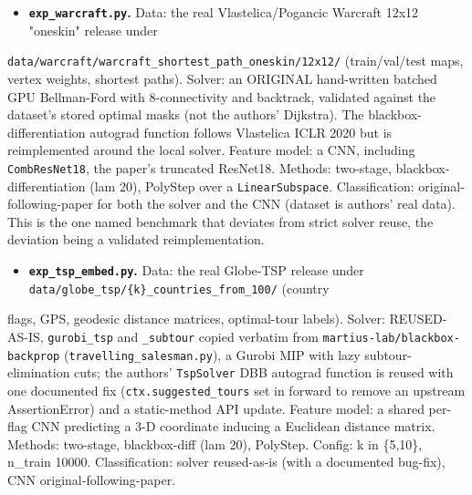 \documentclass[10pt]{article}
\begin{document}
\begin{itemize}\setlength{\itemsep}{2pt}
\item \textbf{\texttt{exp\_warcraft.py}.} Data: the real Vlastelica/Pogancic Warcraft 12x12 "oneskin" release under
\end{itemize}
  \texttt{data/warcraft/warcraft\_shortest\_path\_oneskin/12x12/} (train/val/test maps, vertex weights, shortest paths). Solver:
  an ORIGINAL hand-written batched GPU Bellman-Ford with 8-connectivity and backtrack, validated against the dataset's
  stored optimal masks (not the authors' Dijkstra). The blackbox-differentiation autograd function follows Vlastelica
  ICLR 2020 but is reimplemented around the local solver. Feature model: a CNN, including \texttt{CombResNet18}, the paper's
  truncated ResNet18. Methods: two-stage, blackbox-differentiation (lam 20), PolyStep over a \texttt{LinearSubspace}.
  Classification: original-following-paper for both the solver and the CNN (dataset is authors' real data). This is the
  one named benchmark that deviates from strict solver reuse, the deviation being a validated reimplementation.

\begin{itemize}\setlength{\itemsep}{2pt}
\item \textbf{\texttt{exp\_tsp\_embed.py}.} Data: the real Globe-TSP release under \texttt{data/globe\_tsp/\{k\}\_countries\_from\_100/} (country
\end{itemize}
  flags, GPS, geodesic distance matrices, optimal-tour labels). Solver: REUSED-AS-IS, \texttt{gurobi\_tsp} and \texttt{\_subtour}
  copied verbatim from \texttt{martius-lab/blackbox-backprop} (\texttt{travelling\_salesman.py}), a Gurobi MIP with lazy
  subtour-elimination cuts; the authors' \texttt{TspSolver} DBB autograd function is reused with one documented fix
  (\texttt{ctx.suggested\_tours} set in forward to remove an upstream AssertionError) and a static-method API update. Feature
  model: a shared per-flag CNN predicting a 3-D coordinate inducing a Euclidean distance matrix. Methods: two-stage,
  blackbox-diff (lam 20), PolyStep. Config: k in \{5,10\}, n\_train 10000. Classification: solver reused-as-is (with a
  documented bug-fix), CNN original-following-paper.
\end{document}

